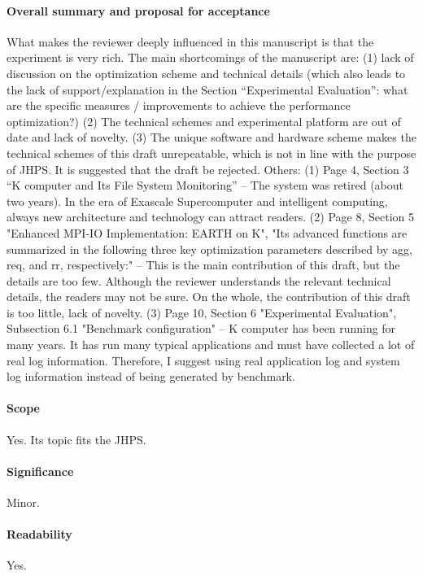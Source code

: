 \documentclass{jhps}
\begin{document}
\paragraph{Overall summary and proposal for acceptance}
What makes the reviewer deeply influenced in this manuscript is that the experiment is very rich. The main shortcomings of the manuscript are: (1) lack of discussion on the optimization scheme and technical details (which also leads to the lack of support/explanation in the Section “Experimental Evaluation”: what are the specific measures / improvements to achieve the performance optimization?) (2) The technical schemes and experimental platform are out of date and lack of novelty. (3) The unique software and hardware scheme makes the technical schemes of this draft unrepeatable, which is not in line with the purpose of JHPS. It is suggested that the draft be rejected.
Others: (1) Page 4, Section 3 “K computer and Its File System Monitoring” -- The system was retired (about two years). In the era of Exascale Supercomputer and intelligent computing, always new architecture and technology can attract readers. (2) Page 8, Section 5 "Enhanced MPI-IO Implementation: EARTH on K", "Its advanced functions are summarized in the following three key optimization parameters described by agg, req, and rr, respectively:" -- This is the main contribution of this draft, but the details are too few. Although the reviewer understands the relevant technical details, the readers may not be sure. On the whole, the contribution of this draft is too little, lack of novelty. (3) Page 10, Section 6 "Experimental Evaluation", Subsection 6.1 "Benchmark configuration" -- K computer has been running for many years. It has run many typical applications and must have collected a lot of real log information. Therefore, I suggest using real application log and system log information instead of being generated by benchmark.
\paragraph{Scope}   %
Yes. Its topic fits the JHPS.
\paragraph{Significance}   %
Minor.
\paragraph{Readability}   %
Yes.
\end{document}
